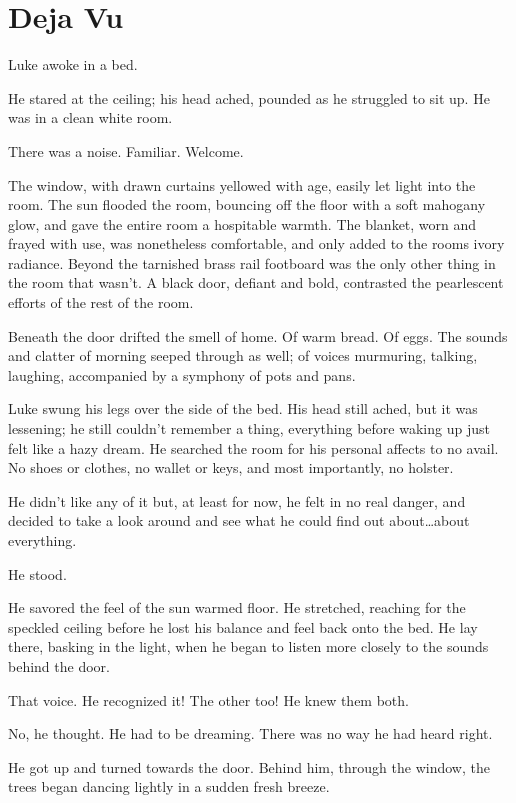 \chapter{Deja Vu}


Luke awoke in a bed.

He stared at the ceiling; his head ached, pounded as he struggled to sit
up. He was in a clean white room.

There was a noise. Familiar. Welcome.

The window, with drawn curtains yellowed with age, easily let light into
the room. The sun flooded the room, bouncing off the floor with a soft
mahogany glow, and gave the entire room a hospitable warmth. The
blanket, worn and frayed with use, was nonetheless comfortable, and only
added to the rooms ivory radiance. Beyond the tarnished brass rail
footboard was the only other thing in the room that wasn't. A black
door, defiant and bold, contrasted the pearlescent efforts of the rest
of the room.

Beneath the door drifted the smell of home. Of warm bread. Of eggs. The
sounds and clatter of morning seeped through as well; of voices
murmuring, talking, laughing, accompanied by a symphony of pots and
pans.

Luke swung his legs over the side of the bed. His head still ached, but
it was lessening; he still couldn't remember a thing, everything before
waking up just felt like a hazy dream. He searched the room for his
personal affects to no avail. No shoes or clothes, no wallet or keys,
and most importantly, no holster.

He didn't like any of it but, at least for now, he felt in no real
danger, and decided to take a look around and see what he could find out
about\ldots about everything.

He stood.

He savored the feel of the sun warmed floor. He stretched, reaching for
the speckled ceiling before he lost his balance and feel back onto the
bed. He lay there, basking in the light, when he began to listen more
closely to the sounds behind the door.

That voice. He recognized it! The other too! He knew them both.

No, he thought. He had to be dreaming. There was no way he had heard
right.

He got up and turned towards the door. Behind him, through the window,
the trees began dancing lightly in a sudden fresh breeze.

